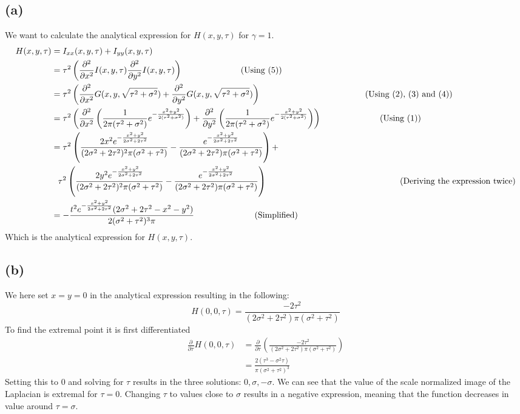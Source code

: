 \documentclass[a4paper]{article}
\newcommand{\comment}[1]{%
  \text{\phantom{(#1)}} \tag{#1}}
\newcommand{\pd}[2]{%
  \frac{\partial^{#2}}{\partial #1^{#2}}}
\begin{document}
\subsection*{(a)}
We want to calculate the analytical expression for $H(x,y,\tau)$ for $\gamma = 1$.
\begin{align*}
  H(x,y,\tau) &= I_{xx}(x,y,\tau) + I_{yy}(x,y,\tau)\\
  &= \tau^2 \left( \pd{x}{2} I(x,y,\tau) \pd{y}{2} I(x,y,\tau) \right) \comment{Using (5)}\\
  &= \tau^2 \left( \pd{x}{2} G(x,y,\sqrt{\tau^2 + \sigma^2}) + \pd{y}{2} G(x,y,\sqrt{\tau^2 + \sigma^2})\right) \comment{Using (2), (3) and (4)}\\
  &= \tau^2 \left( \pd{x}{2} \left(\frac{1}{2\pi(\tau^2 + \sigma^2)}e^{-\frac{x^2 + y^2}{2(\tau^2 + \sigma^2)}}\right) + \pd{y}{2} \left(\frac{1}{2\pi(\tau^2 + \sigma^2)}e^{-\frac{x^2 + y^2}{2(\tau^2 + \sigma^2)}}\right) \right) \comment{Using (1)}\\
  &= \tau^2 \left(\frac{2x^2e^{- \frac{x^2+y^2}{2\sigma^2 +2\tau^2}}}{(2\sigma^2 + 2\tau^2)^2\pi(\sigma^2 + \tau^2)}- \frac{e^{- \frac{x^2+y^2}{2\sigma^2 +2\tau^2}}}{(2\sigma^2 + 2\tau^2)\pi(\sigma^2 + \tau^2)}\right) + \\
  &\phantom{=} \tau^2\left(\frac{2y^2e^{- \frac{x^2+y^2}{2\sigma^2 +2\tau^2}}}{(2\sigma^2 + 2\tau^2)^2\pi(\sigma^2 + \tau^2)}- \frac{e^{- \frac{x^2+y^2}{2\sigma^2 +2\tau^2}}}{(2\sigma^2 + 2\tau^2)\pi(\sigma^2 + \tau^2)}\right) \comment{Deriving the expression twice}\\
  &= - \frac{t^2 e^{-\frac{x^2 + y^2}{2\sigma^2 + 2\tau^2}}(2\sigma^2 + 2 \tau^2 - x^2 - y^2)}{2(\sigma^2 + \tau^2)^3 \pi} \comment{Simplified}
\end{align*}
Which is the analytical expression for $H(x,y,\tau)$.
\subsection*{(b)}
We here set $x=y=0$ in the analytical expression resulting in the following:
$$
H(0,0,\tau) = \frac{-2\tau^2}{(2\sigma^2 + 2 \tau^2)\pi(\sigma^2 + \tau^2)}
$$
To find the extremal point it is first differentiated
\begin{align*}
  \pd{\tau}{}H(0,0,\tau) &= \pd{\tau}{} \left(\frac{-2\tau^2}{(2\sigma^2 + 2 \tau^2)\pi(\sigma^2 + \tau^2)}\right)\\
  &= \frac{2(\tau^3 -\sigma^2 \tau)}{\pi(\sigma^2 + \tau^2)^3}
\end{align*}
Setting this to 0 and solving for $\tau$ results in the three solutions: $0, \sigma, -\sigma$. We can see that the value of the scale normalized image of the Laplacian is extremal for $\tau = 0$. Changing $\tau$ to values close to $\sigma$ results in a negative expression, meaning that the function decreases in value around $\tau = \sigma$.
\end{document}
